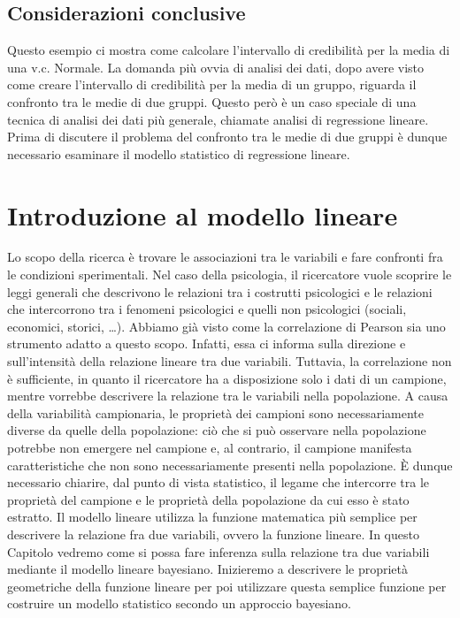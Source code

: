 \documentclass[
  11pt,
]{krantz}
\theoremstyle{definition}
\theoremstyle{definition}
\theoremstyle{definition}
\theoremstyle{definition}
\theoremstyle{remark}
\begin{document}
\hypertarget{considerazioni-conclusive-2}{%
\section*{Considerazioni conclusive}\label{considerazioni-conclusive-2}}


Questo esempio ci mostra come calcolare l'intervallo di credibilità per la media di una v.c. Normale. La domanda più ovvia di analisi dei dati, dopo avere visto come creare l'intervallo di credibilità per la media di un gruppo, riguarda il confronto tra le medie di due gruppi. Questo però è un caso speciale di una tecnica di analisi dei dati più generale, chiamate analisi di regressione lineare. Prima di discutere il problema del confronto tra le medie di due gruppi è dunque necessario esaminare il modello statistico di regressione lineare.

\hypertarget{regr-models-intro}{%
\chapter{Introduzione al modello lineare}\label{regr-models-intro}}

Lo scopo della ricerca è trovare le associazioni tra le variabili e fare confronti fra le condizioni sperimentali. Nel caso della psicologia, il ricercatore vuole scoprire le leggi generali che descrivono le relazioni tra i costrutti psicologici e le relazioni che intercorrono tra i fenomeni psicologici e quelli non psicologici (sociali, economici, storici, \ldots). Abbiamo già visto come la correlazione di Pearson sia uno strumento adatto a questo scopo. Infatti, essa ci informa sulla direzione e sull'intensità della relazione lineare tra due variabili. Tuttavia, la correlazione non è sufficiente, in quanto il ricercatore ha a disposizione solo i dati di un campione, mentre vorrebbe descrivere la relazione tra le variabili nella popolazione. A causa della variabilità campionaria, le proprietà dei campioni sono necessariamente diverse da quelle della popolazione: ciò che si può osservare nella popolazione potrebbe non emergere nel campione e, al contrario, il campione manifesta caratteristiche che non sono necessariamente presenti nella popolazione. È dunque necessario chiarire, dal punto di vista statistico, il legame che intercorre tra le proprietà del campione e le proprietà della popolazione da cui esso è stato estratto. Il modello lineare utilizza la funzione matematica più semplice per descrivere la relazione fra due variabili, ovvero la funzione lineare. In questo Capitolo vedremo come si possa fare inferenza sulla relazione tra due variabili mediante il modello lineare bayesiano. Inizieremo a descrivere le proprietà geometriche della funzione lineare per poi utilizzare questa semplice funzione per costruire un modello statistico secondo un approccio bayesiano.
\end{document}
